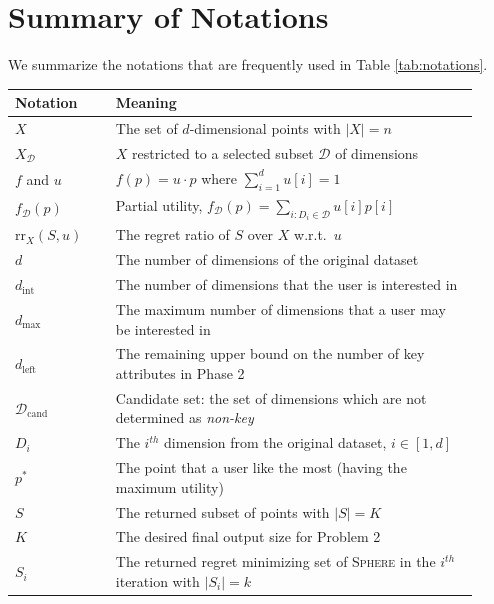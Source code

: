 \clearpage
\appendices

\section{Summary of Notations}
\label{appen:summary}
We summarize the notations that are frequently used in Table \ref{tab:notations}.

\begin{table}[h]
\centering
\small
\renewcommand{\arraystretch}{1.15}
\setlength{\tabcolsep}{4pt}

\renewcommand{\arraystretch}{1.2}
\begin{tabular}{|>{\centering\arraybackslash}m{0.20\linewidth}|>{\centering\arraybackslash}m{0.72\linewidth}|}
\hline
\textbf{Notation} & \textbf{Meaning} \\
\hline\hline
$X$ & The set of $d$-dimensional points with $|X| = n$ \\
\hline
$X_\mathcal{D}$ & $X$ restricted to a selected subset $\mathcal{D}$ of dimensions\\
\hline
$f$ and $u$ & $f(p)=u\cdot p$ where $\sum_{i=1}^{d} u[i]=1$ \\
\hline
$f_\mathcal{D} (p)$ & Partial utility, $f_\mathcal{D} (p) = \sum_{i:D_i\in \mathcal{D}}u[i]p[i]$ \\
\hline
$\mathrm{rr}_X(S,u)$ & The regret ratio of $S$ over $X$ w.r.t.\ $u$ \\
\hline
$d$ & The number of dimensions of the original dataset \\
\hline
$d_\text{int}$ & The number of dimensions that the user is interested in \\
\hline
$d_\text{max}$ & The maximum number of dimensions that a user may be interested in \\
\hline
$d_\text{left}$ & The remaining upper bound on the number of key attributes in Phase 2 \\
\hline
$\mathcal{D}_\text{cand}$ & Candidate set: the set of dimensions which are not determined as \textit{non-key} \\
\hline
$D_i$ & The $i^{th}$ dimension from the original dataset, $i\in[1,d]$\\
\hline
$p^*$ & The point that a user like the most (having the maximum utility) \\
\hline
$S$ & The returned subset of points with $|S|=K$ \\
\hline
$K$ & The desired final output size for Problem 2 \\
\hline
$S_i$ & The returned regret minimizing set of \textsc{Sphere} in the $i^{th}$ iteration with $|S_i|=k$ \\

\end{tabular}
\end{table}
